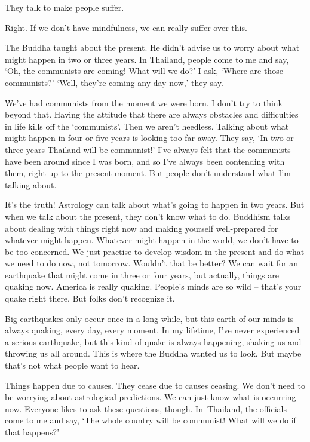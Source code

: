  They talk to make people suffer.

 Right. If we don't have mindfulness, we can really suffer over this.

 The Buddha taught about the present. He didn't advise us to worry about what might happen in two or three years. In Thailand, people come to me and say, `Oh,  the communists are coming! What will we do?' I ask, `Where are those communists?' `Well, they're coming any day now,' they say.

We've had communists from the moment we were born. I don't try to think beyond that. Having the attitude that there are always obstacles and difficulties in life kills off the `communists'. Then we aren't heedless. Talking about what might happen in four or five years is looking too far away. They say, `In two or three years Thailand will be communist!' I've always felt that the communists have been around since I was born, and so I've always been contending with them, right up to the present moment. But people don't understand what I'm talking about.

It's the truth! Astrology can talk about what's going to happen in two years. But when we talk about the present, they don't know what to do. Buddhism talks about dealing with things right now and making yourself well-prepared for whatever might happen. Whatever might happen in the world, we don't have to be too concerned. We just practise to develop wisdom in the present and do what we need to do now, not tomorrow. Wouldn't that be better? We can wait for an earthquake that might come in three or four years, but actually, things are quaking now. America is really quaking. People's minds are so wild -- that's your quake right there. But folks don't recognize it.

Big earthquakes only occur once in a long while, but this earth of our minds is always quaking, every day, every moment. In my lifetime, I've never experienced a serious earthquake, but this kind of quake is always happening, shaking us and throwing us all around. This is where the Buddha wanted us to look. But maybe that's not what people want to hear.

Things happen due to causes. They cease due to causes ceasing. We don't need to be worrying about astrological predictions. We can just know what is occurring now. Everyone likes to ask these questions, though. \mbox{In Thailand,} the officials come to me and say, `The whole country will be communist! What will we do if that happens?'

